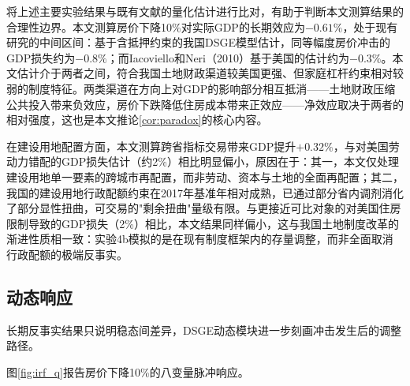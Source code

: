 \documentclass[UTF8,a4paper,12pt]{ctexart}
\theoremstyle{plain}
\theoremstyle{definition}
\theoremstyle{remark}
\begin{document}
将上述主要实验结果与既有文献的量化估计进行比对，有助于判断本文测算结果的合理性边界。本文测算房价下降10\%对实际GDP的长期效应为$-0.61\%$，处于现有研究的中间区间：\citet{liuetal2013}基于含抵押约束的我国DSGE模型估计，同等幅度房价冲击的GDP损失约为$-0.8\%$；而Iacoviello和Neri（2010）基于美国的估计约为$-0.3\%$。本文估计介于两者之间，符合我国土地财政渠道较美国更强、但家庭杠杆约束相对较弱的制度特征。两类渠道在方向上对GDP的影响部分相互抵消——土地财政压缩公共投入带来负效应，房价下跌降低住房成本带来正效应——净效应取决于两者的相对强度，这也是本文推论\ref{cor:paradox}的核心内容。

在建设用地配置方面，本文测算跨省指标交易带来GDP提升$+0.32\%$，与\citet{fajgelbaum2019}对美国劳动力错配的GDP损失估计（约2\%）相比明显偏小，原因在于：其一，本文仅处理建设用地单一要素的跨城市再配置，而非劳动、资本与土地的全面再配置；其二，我国的建设用地行政配额约束在2017年基准年相对成熟，已通过部分省内调剂消化了部分显性扭曲，可交易的"剩余扭曲"量级有限。与更接近可比对象的\citet{hsiehmoretti2019}对美国住房限制导致的GDP损失（2\%）相比，本文结果同样偏小，这与我国土地制度改革的渐进性质相一致：实验4b模拟的是在现有制度框架内的存量调整，而非全面取消行政配额的极端反事实。

\subsection{动态响应}

长期反事实结果只说明稳态间差异，DSGE动态模块进一步刻画冲击发生后的调整路径。

图\ref{fig:irf_q}报告房价下降10\%的八变量脉冲响应。
\end{document}

